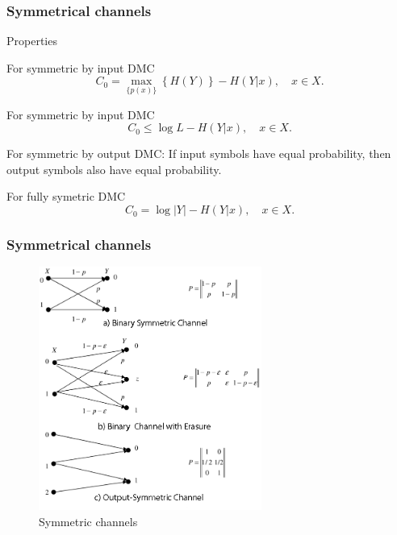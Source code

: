 \documentclass[14pt]{beamer}
\begin{document}
\begin{frame}
\frametitle{Symmetrical channels}
Properties
\begin{itemize}
\small{

    \item[1] 
    \begin{prop} \label{pr5_1} For symmetric by input DMC
    \[
    C_0 = \mathop {\max }\limits_{\{p(x)\}} \left\{ {H(Y)} \right\} - H(Y\vert
    x), \quad x \in X.
    \]
    \end{prop}
    
    \item[2]
    \begin{prop} \label{pr5_2}  For symmetric by input DMC
    \[
    C_0 \le \log L - H(Y\vert x), \quad x \in X.
    \]
    \end{prop}
    
    \item[3]
    \begin{prop} \label{pr5_3}  For symmetric by output DMC: If input symbols have equal probability, then output symbols also have equal probability.
    \end{prop}
    
    \item[4]
    \begin{prop}\label{pr5_4}  For fully symetric DMC
    \[
    C_0 = \log \vert Y\vert - H(Y\vert x), \quad x \in X.
    \]
    \end{prop}
}

\end{itemize}
\end{frame}


\begin{frame}
\frametitle{Symmetrical channels}
\begin{itemize}
    \begin{figure}[ht]
    \includegraphics[width=0.65\textwidth]{fig5_8.png}
    \caption{Symmetric channels} \label{fig5_8}
    \end{figure}
\end{itemize}
\end{frame}
\end{document}
